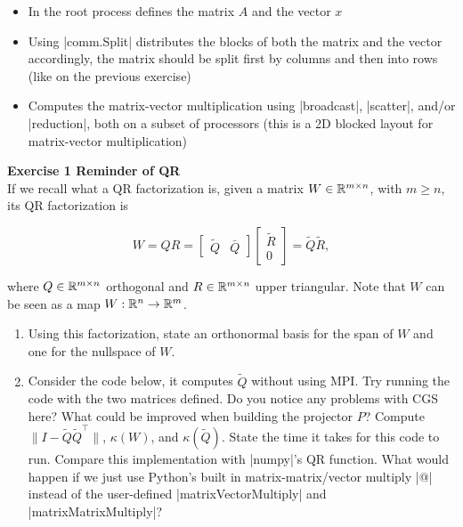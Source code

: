 \documentclass[11pt]{article}
\begin{document}
\begin{itemize}
   \item In the root process defines the matrix $A$ and the vector $x$
   \item Using |comm.Split| distributes the blocks of both the matrix and the vector accordingly, the matrix should be split first by columns and then into rows (like on the previous exercise)
   \item Computes the matrix-vector multiplication using |broadcast|, |scatter|, and/or |reduction|, both on a subset of processors (this is a 2D blocked layout for matrix-vector multiplication)
\end{itemize}

\bigskip

{\bf{Exercise 1 Reminder of QR}}\\

If we recall what a QR factorization is, given a matrix $W \in \mathbb{R}^{m \times n}$, with $m \geq n$, its QR factorization is

\[ W = QR = \begin{bmatrix} \tilde{Q} & \bar{Q} \end{bmatrix} \begin{bmatrix} \tilde{R} \\ 0 \end{bmatrix} = \tilde{Q}\tilde{R}, \]

where $Q \in \mathbb{R}^{m \times n}$ orthogonal and $R \in \mathbb{R}^{m \times n}$ upper triangular. Note that $W$ can be seen as a map $W: \mathbb{R}^{n} \to \mathbb{R}^{m}$. 

\begin{enumerate}
   \item Using this factorization, state an orthonormal basis for the span of $W$ and one for the nullspace of $W$. 
   \item Consider the code below, it computes $\tilde{Q}$ without using MPI. Try running the code with the two matrices defined. Do you notice any problems with CGS here? What could be improved when building the projector $P$? Compute $\|I - \tilde{Q}\tilde{Q}^\top\|$, $\kappa(W)$, and $\kappa(\tilde{Q})$. State the time it takes for this code to run. Compare this implementation with |numpy|'s QR function. What would happen if we just use Python's built in matrix-matrix/vector multiply |@| instead of the user-defined |matrixVectorMultiply| and |matrixMatrixMultiply|?
   
\end{enumerate}
\end{document}

